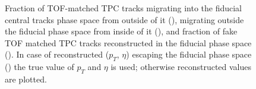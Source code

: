 \begin{figure}
{\begin{subfigure}[b]{\linewidth}{
                }
  \end{subfigure}
}
\quad
\parbox{0.315\textwidth}{
  \centering
  \begin{subfigure}[b]{\linewidth}{
                }
  \end{subfigure}
}\vspace*{-5pt}%
\caption[Fractions of migrating and fake TPC tracks matched with TOF.]{Fraction of TOF-matched TPC tracks migrating into the fiducial central tracks phase space from outside of it (), migrating outside the fiducial phase space from inside of it (), and fraction of fake TOF matched TPC tracks reconstructed in the fiducial phase space (). In case of reconstructed ($p_{T}$, $\eta$) escaping the fiducial phase space () the true value of $p_{T}$ and $\eta$ is used; otherwise reconstructed values are plotted.}
\label{fig:migrationsAndFakes_TPC}%
\end{figure}


